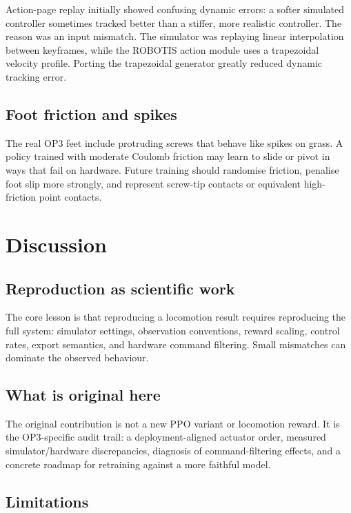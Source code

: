 Action-page replay initially showed confusing dynamic errors: a softer simulated controller sometimes tracked better than a stiffer, more realistic controller. The reason was an input mismatch. The simulator was replaying linear interpolation between keyframes, while the ROBOTIS action module uses a trapezoidal velocity profile. Porting the trapezoidal generator greatly reduced dynamic tracking error.

\subsection{Foot friction and spikes}

The real OP3 feet include protruding screws that behave like spikes on grass. A policy trained with moderate Coulomb friction may learn to slide or pivot in ways that fail on hardware. Future training should randomise friction, penalise foot slip more strongly, and represent screw-tip contacts or equivalent high-friction point contacts.

\section{Discussion}
\label{sec:discussion}

\subsection{Reproduction as scientific work}

The core lesson is that reproducing a locomotion result requires reproducing the full system: simulator settings, observation conventions, reward scaling, control rates, export semantics, and hardware command filtering. Small mismatches can dominate the observed behaviour.

\subsection{What is original here}

The original contribution is not a new PPO variant or locomotion reward. It is the OP3-specific audit trail: a deployment-aligned actuator order, measured simulator/hardware discrepancies, diagnosis of command-filtering effects, and a concrete roadmap for retraining against a more faithful model.

\subsection{Limitations}


